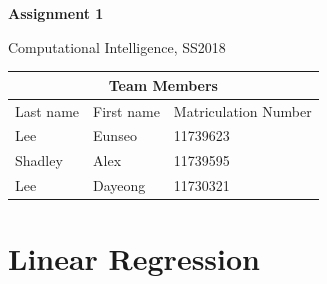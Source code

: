 \documentclass[a4paper]{article}
\begin{document}
\begin{titlepage}
  \centering
    {\huge \bf Assignment 1\par}
    \vspace{1cm}
    {\Large Computational Intelligence, SS2018\par}
    \vspace{1cm}
    \begin{tabular}{|l|l|l|}
      \hline
      \multicolumn{3}{|c|}{\textbf{Team Members}}   \\ \hline
      Last name & First name & Matriculation Number \\ \hline
      Lee       & Eunseo     & 11739623             \\ \hline
      Shadley   & Alex       & 11739595             \\ \hline
      Lee       & Dayeong    & 11730321             \\ \hline
    \end{tabular}
\end{titlepage}

\section{Linear Regression}
\end{document}
